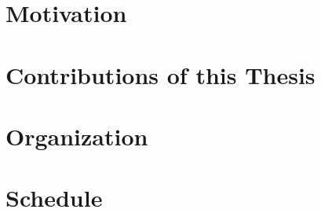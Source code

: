 \section{Motivation}
\label{motivation}


\section{Contributions of this Thesis}
\label{contributions}


\section{Organization}
\label{organization}

 
\section{Schedule}
\label{schedule}

